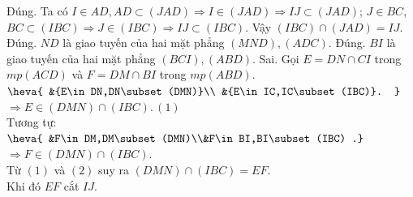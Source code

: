 \begin{ex}
{  \begin{itemchoice}
   \itemch Đúng. Ta có $  I\in AD,AD\subset (JAD)\Rightarrow I\in (JAD)\Rightarrow IJ\subset (JAD)$; $ J\in BC$,\\
   $BC\subset  (IBC)\Rightarrow J\in (IBC)\Rightarrow IJ\subset (IBC)$. Vậy $ (IBC)\cap (JAD)=IJ$.
   \itemch Đúng. $ ND$ là giao tuyến của hai mặt phẳng $  (MND),(ADC)$.
   \itemch Đúng. $ BI$ là giao tuyến của hai mặt phẳng $  (BCI),(ABD)$.
   \itemch Sai. Gọi $ E=DN\cap CI$ trong $ mp(ACD)$  và $ F=DM\cap BI$ trong $ mp(ABD)$.\\
   $\heva{ 
    &{E\in DN,DN\subset (DMN)}\\
   &{E\in  IC,IC\subset (IBC)}.
   }$\\ 
   $\Rightarrow E\in  (DMN)\cap (IBC).\,(1)$ \\
    Tương tự:
   $\heva{  &F\in DM,DM\subset (DMN)\\&F\in BI,BI\subset (IBC)
   .}$  \\
    $\Rightarrow F\in (DMN)\cap (IBC).$\\
   Từ $(1)$ và $(2)$ suy ra  $ (DMN)\cap (IBC)=EF$.\\
   Khi đó $EF$ cắt $IJ$. 
  \end{itemchoice}
 } 
\end{ex}

